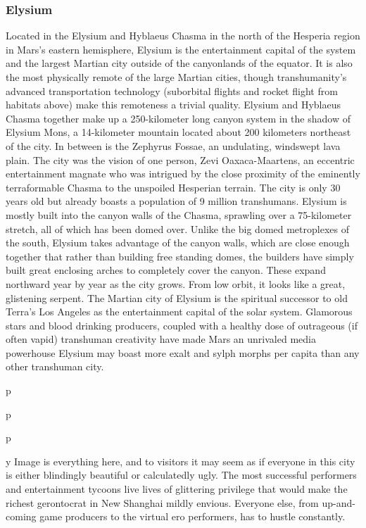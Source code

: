 \subsubsection{Elysium}

Located in the Elysium and Hyblaeus Chasma in 
the north of the Hesperia region in Mars's eastern 
hemisphere, Elysium is the entertainment capital of 
the system and the largest Martian city outside of 
the canyonlands of the equator. It is also the most 
physically remote of the large Martian cities, though 
transhumanity's advanced transportation technology
(suborbital flights and rocket flight from habitats
above) make this remoteness a trivial quality.
Elysium and Hyblaeus Chasma together make up 
a 250-kilometer long canyon system in the shadow 
of Elysium Mons, a 14-kilometer mountain located 
about 200 kilometers northeast of the city. In between 
is the Zephyrus Fossae, an undulating, windswept 
lava plain. The city was the vision of one person, 
Zevi Oaxaca-Maartens, an eccentric entertainment 
magnate who was intrigued by the close proximity of 
the eminently terraformable Chasma to the unspoiled 
Hesperian terrain.
The city is only 30 years old but already boasts 
a population of 9 million transhumans. Elysium is 
mostly built into the canyon walls of the Chasma, 
sprawling over a 75-kilometer stretch, all of which 
has been domed over. Unlike the big domed metroplexes
of the south, Elysium takes advantage of the
canyon walls, which are close enough together that 
rather than building free standing domes, the builders 
have simply built great enclosing arches to completely 
cover the canyon. These expand northward year by 
year as the city grows. From low orbit, it looks like a 
great, glistening serpent.
The Martian city of Elysium is the spiritual successor
to old Terra's Los Angeles as the entertainment
capital of the solar system. Glamorous stars and 
blood drinking producers, coupled with a healthy 
dose of outrageous (if often vapid) transhuman 
creativity have made Mars an unrivaled media powerhouse
Elysium may boast more exalt and sylph
morphs per capita than any other transhuman city. 

p

p

p

y
Image is everything here, and to visitors it may seem 
as if everyone in this city is either blindingly beautiful 
or calculatedly ugly. The most successful performers
and entertainment tycoons live lives of glittering
privilege that would make the richest gerontocrat in 
New Shanghai mildly envious. Everyone else, from 
up-and-coming game producers to the virtual ero 
performers, has to hustle constantly.

